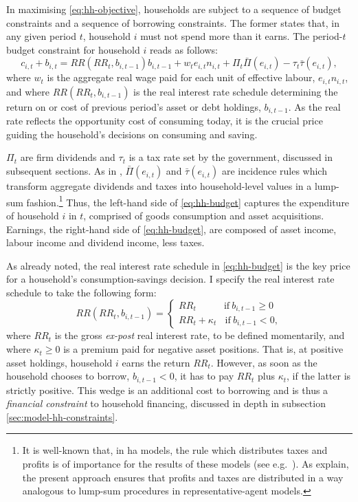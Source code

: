 \documentclass[a4paper,12pt]{article} %
\numberwithin{equation}{section} %
\numberwithin{figure}{section}
\numberwithin{table}{section}
\begin{document}
In maximising \eqref{eq:hh-objective}, households are subject to a sequence of budget constraints and a sequence of borrowing constraints. The former states that, in any given period $t$, household $i$ must not spend more than it earns. The period-$t$ budget constraint for household $i$ reads as follows: 
\begin{equation}
c_{i,t} + b_{i,t} = RR (RR_t, b_{i,t-1}) b_{i,t-1} + w_t e_{i,t} n_{i,t} + \Pi_t \bar{\Pi} (e_{i,t}) - \tau_t \bar{\tau} (e_{i,t}), \label{eq:hh-budget}
\end{equation}
where $w_t$ is the aggregate real wage paid for each unit of effective labour, $e_{i,t} n_{i,t}$, and where $RR (RR_t, b_{i,t-1})$ is the real interest rate schedule determining the return on or cost of previous period's asset or debt holdings, $b_{i,t-1}$. As the real rate reflects the opportunity cost of consuming today, it is the crucial price guiding the household's decisions on consuming and saving. 

$\Pi_t$ are firm dividends and $\tau_t$ is a tax rate set by the government, discussed in subsequent sections. As in \textcite{mckay2016}, $\bar{\Pi} (e_{i,t})$ and $\bar{\tau} (e_{i,t})$ are incidence rules which transform aggregate dividends and taxes into household-level values in a lump-sum fashion.\footnote{It is well-known that, in \Gls{ha} models, the rule which distributes taxes and profits is of importance for the results of these models (see e.g.~\cite{kaplan2018}). As \textcite{mckay2016} explain, the present approach ensures that profits and taxes are distributed in a way analogous to lump-sum procedures in representative-agent models.} Thus, the left-hand side of \eqref{eq:hh-budget} captures the expenditure of household $i$ in $t$, comprised of goods consumption and asset acquisitions. Earnings, the right-hand side of \eqref{eq:hh-budget}, are composed of asset income, labour income and dividend income, less taxes.

As already noted, the real interest rate schedule in \eqref{eq:hh-budget} is the key price for a household's consumption-savings decision. I specify the real interest rate schedule to take the following form:
\begin{equation}
    RR (RR_t, b_{i,t-1}) = \begin{cases}
	RR_t \ \ \ \ \ \ \ \ \ \ \ \ \ \text{if} \ b_{i,t-1} \ge 0 \\
	RR_t + \kappa_t \ \ \ \ \text{if} \ b_{i,t-1} < 0,
	\end{cases} \label{eq:hh-interest-rate-wedge}
\end{equation}
where $RR_t$ is the gross \textit{ex-post} real interest rate, to be defined momentarily, and where $\kappa_t \ge 0$ is a premium paid for negative asset positions. That is, at positive asset holdings, household $i$ earns the return $RR_t$. However, as soon as the household chooses to borrow, $b_{i,t-1} < 0$, it has to pay $RR_t$ plus $\kappa_t$, if the latter is strictly positive. This wedge is an additional cost to borrowing and is thus a \textit{financial constraint} to household financing, discussed in depth in subsection \ref{sec:model-hh-constraints}.
\end{document}
